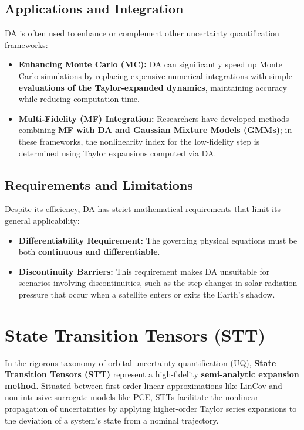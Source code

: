 \documentclass[
  letterpaper,
  DIV=11,
  numbers=noendperiod,
  oneside]{scrartcl}
\begin{document}
\subsection{Applications and
Integration}\label{applications-and-integration}

DA is often used to enhance or complement other uncertainty
quantification frameworks:

\begin{itemize}
\item
  \textbf{Enhancing Monte Carlo (MC):} DA can significantly speed up
  Monte Carlo simulations by replacing expensive numerical integrations
  with simple \textbf{evaluations of the Taylor-expanded dynamics},
  maintaining accuracy while reducing computation time.
\item
  \textbf{Multi-Fidelity (MF) Integration:} Researchers have developed
  methods combining \textbf{MF with DA and Gaussian Mixture Models
  (GMMs)}; in these frameworks, the nonlinearity index for the
  low-fidelity step is determined using Taylor expansions computed via
  DA.
\end{itemize}

\subsection{Requirements and
Limitations}\label{requirements-and-limitations}

Despite its efficiency, DA has strict mathematical requirements that
limit its general applicability:

\begin{itemize}
\item
  \textbf{Differentiability Requirement:} The governing physical
  equations must be both \textbf{continuous and differentiable}.
\item
  \textbf{Discontinuity Barriers:} This requirement makes DA unsuitable
  for scenarios involving discontinuities, such as the step changes in
  solar radiation pressure that occur when a satellite enters or exits
  the Earth's shadow.
\end{itemize}

\section{State Transition Tensors (STT)}\label{sec-stt}

In the rigorous taxonomy of orbital uncertainty quantification (UQ),
\textbf{State Transition Tensors (STT)} represent a high-fidelity
\textbf{semi-analytic expansion method}. Situated between first-order
linear approximations like LinCov and non-intrusive surrogate models
like PCE, STTs facilitate the nonlinear propagation of uncertainties by
applying higher-order Taylor series expansions to the deviation of a
system's state from a nominal trajectory.
\end{document}
